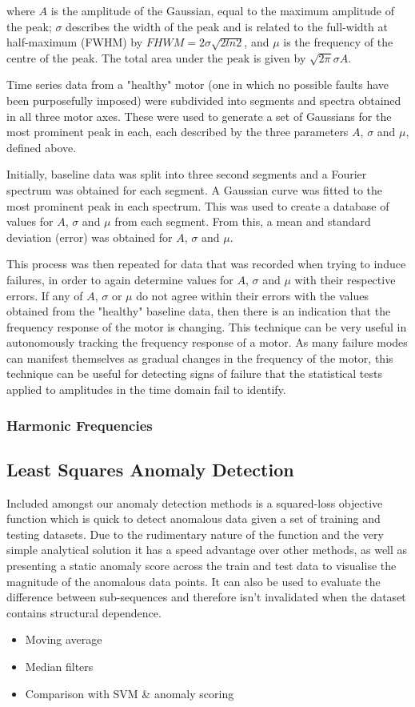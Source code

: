 where $A$ is the amplitude of the Gaussian, equal to the maximum amplitude of the peak; $\sigma$ describes the width of the peak and is related to the full-width at half-maximum (FWHM) by $FHWM = 2\sigma \sqrt{2ln2}$, and $\mu$ is the frequency of the centre of the peak. The total area under the peak is given by $\sqrt{2\pi}\sigma A$.

Time series data from a "healthy" motor (one in which no possible faults have been purposefully imposed) were subdivided into segments and spectra obtained in all three motor axes. These were used to generate a set of Gaussians for the most prominent peak in each, each described by the three parameters $A$, $\sigma$ and $\mu$, defined above.

Initially, baseline data was split into three second segments and a Fourier spectrum was obtained for each segment. A Gaussian curve was fitted to the most prominent peak in each spectrum. This was used to create a database of values for $A$, $\sigma$ and $\mu$ from each segment. From this, a mean and standard deviation (error) was obtained for $A$, $\sigma$ and $\mu$. 

This process was then repeated for data that was recorded when trying to induce failures, in order to again determine values for $A$, $\sigma$ and $\mu$ with their respective errors. If any of $A$, $\sigma$ or $\mu$ do not agree within their errors with the values obtained from the "healthy" baseline data, then there is an indication that the frequency response of the motor is changing. This technique can be very useful in autonomously tracking the frequency response of a motor. As many failure modes can manifest themselves as gradual changes in the frequency of the motor, this technique can be useful for detecting signs of failure that the statistical tests applied to amplitudes in the time domain fail to identify. 
 
\subsubsection{Harmonic Frequencies}


\subsection{Least Squares Anomaly Detection}
Included amongst our anomaly detection methods is a squared-loss objective function which is quick to detect anomalous data given a set of training and testing datasets. Due to the rudimentary nature of the function and the very simple analytical solution it has a speed advantage over other methods, as well as presenting a static anomaly score across the train and test data to visualise the magnitude of the anomalous data points. It can also be used to evaluate the difference between sub-sequences and therefore isn't invalidated when the dataset contains structural dependence.
\begin{itemize}
\item Moving average
\item Median filters
\item Comparison with SVM \& anomaly scoring
\end{itemize}

